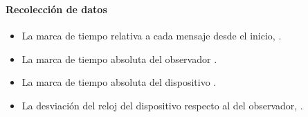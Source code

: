 \begin{frame}
\frametitle{\secname} %
\framesubtitle{Recolección de datos} %
\rmfamily %
\color{black} %
\begin{minipage}{0.5\textwidth}
\begin{itemize}
    \item La marca de tiempo relativa a cada mensaje desde el inicio, .
    \item La marca de tiempo absoluta del observador .
    \item La marca de tiempo absoluta del dispositivo .
    \item La desviación del reloj del dispositivo respecto al del observador, .
\end{itemize}
\end{minipage}
\begin{minipage}{0.3\textwidth}
\begin{figure}
    \centering
\end{figure}
\end{minipage}
\end{frame}

